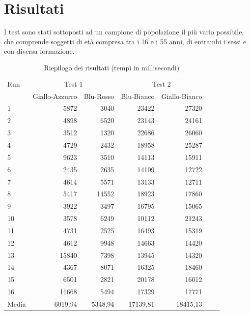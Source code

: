 \documentclass[a4paper]{article}
\begin{document}
\section{Risultati}
 I test sono stati sottoposti ad un campione di popolazione il più vario possibile, che comprende soggetti di età compresa tra i 16 e i 55 anni, di entrambi i sessi e con diversa formazione.
\begin{table}[http]
\centering
\begin{tabular}{lrrrrrr}
\toprule
Run & \multicolumn{2}{c}{Test 1} & \multicolumn{2}{c}{Test 2} \\
& {Giallo-Azzurro} & {Blu-Rosso} & {Blu-Bianco} & {Giallo-Bianco}\\
\midrule
1 & 5872 & 3040 & 23422 & 27320 \\
2 & 4898 & 6520 & 23143 & 24161 \\
3 & 3512 & 1320 & 22686 & 26060 \\
4 & 4729 & 2432 & 18958 & 25287 \\
5 & 9623 & 3510 & 14113 & 15911 \\
6 & 2435 & 2635 & 14109 & 12722 \\
7 & 4614 & 5571 & 13133 & 12711 \\
8 & 5417 & 14552 & 18923 & 17860 \\
9 & 3922 & 3497 & 16795 & 15065 \\
10 & 3578 & 6249 & 10112 & 21243 \\
11 & 4731 & 2525 & 16493 & 15319 \\
12 & 4612 & 9948 & 14663 & 14420 \\
13 & 15840 & 7398 & 13945 & 14320 \\
14 & 4367 & 8071 & 16325 & 18460 \\
15 & 6501 & 2821 & 20178 & 16012 \\
16 & 11668 & 5494 & 17329 & 17771 \\
\midrule
Media & 6019,94 & 5348,94 & 17139,81 & 18415,13 \\
\bottomrule

\end{tabular}
\caption{Riepilogo dei risultati (tempi in millisecondi)}
\label{tabella:risultati}
\end{table}
\end{document}
